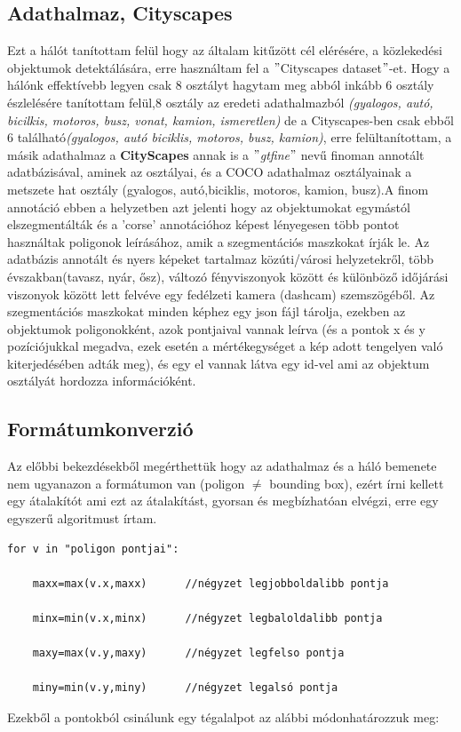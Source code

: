 \documentclass[12pt,oneside,a4paper]{article}
\theoremstyle{remark}
\begin{document}
\subsection{Adathalmaz, Cityscapes}\label{subsec:adathalmaz-cityscapes}
Ezt a hálót tanítottam felül hogy az általam kitűzött cél elérésére, a közlekedési objektumok detektálására,
 erre használtam fel a \("\)Cityscapes dataset\("\)\cite{cityscapes}-et.
 Hogy a hálónk effektívebb legyen csak 8 osztályt hagytam meg abból inkább 6 osztály észlelésére tanítottam
 felül,8 osztály az eredeti adathalmazból \textit{(gyalogos, autó, bicilkis, motoros, busz, vonat, kamion, ismeretlen)}
de a Cityscapes-ben csak ebből 6 található\textit{(gyalogos, autó biciklis, motoros, busz, kamion)}, erre felültanítottam,
 a másik adathalmaz a \textbf{CityScapes} annak is a \("\)\textit{gtfine}\("\) nevű finoman annotált adatbázisával,
aminek az osztályai, és a COCO adathalmaz osztályainak a metszete hat osztály (gyalogos, autó,biciklis,
motoros, kamion, busz).A finom annotáció ebben a helyzetben azt jelenti hogy az objektumokat egymástól elszegmentálták
és a 'corse' annotációhoz képest lényegesen több pontot használtak poligonok leírásához, amik a szegmentációs maszkokat írják le.
Az adatbázis annotált és nyers képeket tartalmaz
 közúti/városi helyzetekről, több évszakban(tavasz, nyár, ősz), változó fényviszonyok között és különböző
időjárási viszonyok között lett felvéve egy fedélzeti kamera (dashcam) szemszögéből.
 Az szegmentációs maszkokat minden képhez egy json fájl tárolja, ezekben az objektumok poligonokként,
azok pontjaival vannak leírva (és a pontok x és y pozíciójukkal megadva, ezek esetén a mértékegységet a kép adott
tengelyen való kiterjedésében adták meg), és egy el vannak látva egy id-vel ami az objektum osztályát hordozza információként.


\subsection{Formátumkonverzió}\label{subsec:formatumkonverzio}
Az előbbi bekezdésekből megérthettük hogy az adathalmaz és a háló bemenete nem ugyanazon a formátumon van (poligon $\neq$ bounding box),
ezért írni kellett egy átalakítót ami ezt az átalakítást, gyorsan és megbízhatóan elvégzi, erre egy egyszerű algoritmust írtam.
\newline
\begin{verbatim}
for v in "poligon pontjai":

    maxx=max(v.x,maxx)      //négyzet legjobboldalibb pontja

    minx=min(v.x,minx)      //négyzet legbaloldalibb pontja

    maxy=max(v.y,maxy)      //négyzet legfelso pontja

    miny=min(v.y,miny)      //négyzet legalsó pontja
\end{verbatim}
Ezekből a pontokból csinálunk egy tégalalpot az alábbi módonhatározzuk meg:
\end{document}
